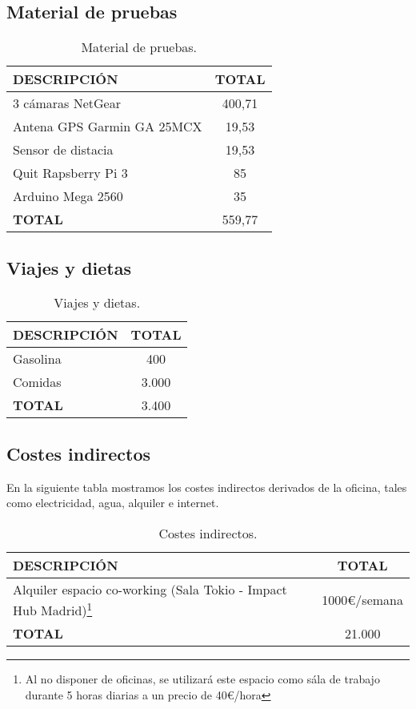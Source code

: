 \documentclass[10pt,a4paper,oldfontcommands]{plantillaDPDS}
\begin{document}
\subsection{Material de pruebas}
\begin{table}[H]
\begin{center}
\begin{tabular}{l c}
\textbf{DESCRIPCIÓN} & \textbf{TOTAL}\\ \hline \hline
3 cámaras NetGear & 400,71\\
Antena GPS Garmin GA 25MCX & 19,53\\
Sensor de distacia & 19,53\\
Quit Rapsberry Pi 3 & 85\\
Arduino Mega 2560 & 35\\ \hline \hline
\textbf{TOTAL} & 559,77\\ \hline
\end{tabular}
\caption{Material de pruebas.}
\label{tab:pruebas}
\end{center}
\end{table}





\subsection{Viajes y dietas}
\begin{table}[H]
\begin{center}
\begin{tabular}{l c}
\textbf{DESCRIPCIÓN} & \textbf{TOTAL}\\ \hline \hline
Gasolina & 400\\
Comidas & 3.000\\ \hline \hline
\textbf{TOTAL} & 3.400\\ \hline
\end{tabular}
\caption{Viajes y dietas.}
\label{tab:viajes}
\end{center}
\end{table}


\subsection{Costes indirectos}
En la siguiente tabla mostramos los costes indirectos derivados de la oficina, tales como electricidad, agua, alquiler e internet.
\begin{table}[H]
\begin{center}
\begin{tabular}{l c}
\textbf{DESCRIPCIÓN} & \textbf{TOTAL}\\ \hline \hline
Alquiler espacio co-working (Sala Tokio - Impact Hub Madrid)\footnote{Al no disponer de oficinas, se utilizará este espacio como sála de trabajo durante 5 horas diarias a un precio de 40\euro/hora} & 1000\euro/semana\\ \hline \hline
\textbf{TOTAL} & 21.000\\ \hline
\end{tabular}
\caption{Costes indirectos.}
\label{tab:indirectos}
\end{center}
\end{table}
\end{document}
